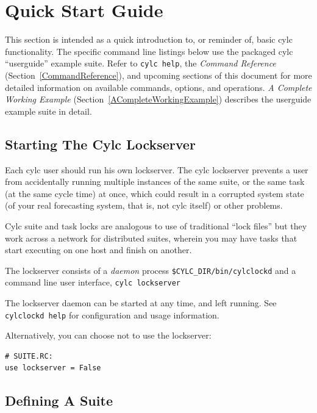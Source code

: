 \documentclass[11pt,a4paper]{article}
\begin{document}
\pagebreak
\section{Quick Start Guide} 
\label{QuickStartGuide}

\lstset{language=bash}

This section is intended as a quick introduction to, or reminder of,
basic cylc functionality. The specific command line listings below use
the packaged cylc ``userguide'' example suite. Refer to 
\lstinline=cylc help=, the {\em Command Reference}
(Section~\ref{CommandReference}), and
upcoming sections of this document for more detailed information on
available commands, options, and operations.  {\em A Complete Working
Example} (Section~\ref{ACompleteWorkingExample}) describes the
userguide example suite in detail.


\subsection{Starting The Cylc Lockserver}
\label{QuickStartingTheCylcLockserver}

Each cylc user should run his own lockserver. The cylc lockserver
prevents a user from accidentally running multiple instances of the same
suite, or the same task (at the same cycle time) at once, which could
result in a corrupted system state (of your real forecasting system,
that is, not cylc itself) or other problems. 

Cylc suite and task locks are analogous to use of traditional ``lock
files'' but they work across a network for distributed suites, wherein
you may have tasks that start executing on one host and finish on
another.

The lockserver consists of a {\em daemon} process
\lstinline=$CYLC_DIR/bin/cylclockd= and a
command line user interface, \lstinline=cylc lockserver=

The lockserver daemon can be started at any time, and left running.
See \lstinline=cylclockd help= for configuration and usage information.

Alternatively, you can choose not to use the lockserver:

\begin{lstlisting}
# SUITE.RC:
use lockserver = False
\end{lstlisting}

\subsection{Defining A Suite} 
\label{QuickDefiningASuite}
\end{document}
